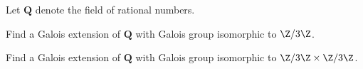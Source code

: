 Let $\mathbf{Q}$ denote the field of rational numbers.
\begin{alist}
\item Find a Galois extension of $\mathbf{Q}$ with Galois group 
isomorphic to $\Z/3\Z$.
\item Find a Galois extension of $\mathbf{Q}$ with Galois group
isomorphic to $\Z/3\Z\times \Z/3\Z$.
\end{alist}
